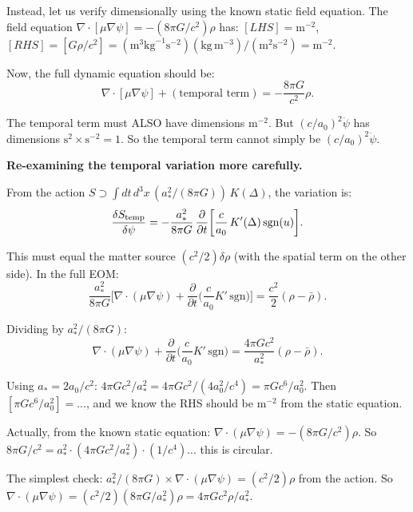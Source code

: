 \documentclass[11pt]{article}
\begin{document}
Instead, let us verify dimensionally using the known static field equation.
The field equation $\nabla\cdot[\mu\nabla\psi] = -(8\pi G/c^2)\rho$ has:
$[LHS] = \text{m}^{-2}$,
$[RHS] = [G\rho/c^2] = (\text{m}^3\text{kg}^{-1}\text{s}^{-2})
(\text{kg}\,\text{m}^{-3})/(\text{m}^2\text{s}^{-2}) = \text{m}^{-2}$. \checkmark

Now, the full dynamic equation should be:
\begin{equation}
\nabla\cdot[\mu\nabla\psi] + (\text{temporal term}) = -\frac{8\pi G}{c^2}\rho.
\end{equation}

The temporal term must ALSO have dimensions $\text{m}^{-2}$. But
$(c/a_0)^2\ddot\psi$ has dimensions $\text{s}^2 \times \text{s}^{-2} = 1$.
So the temporal term cannot simply be $(c/a_0)^2\ddot\psi$.

\textbf{Re-examining the temporal variation more carefully.}

From the action $S \supset \int dt\,d^3x\,(a_*^2/(8\pi G))\,K(\Delta)$,
the variation is:
\begin{equation}
\frac{\delta S_{\rm temp}}{\delta\psi} = -\frac{a_*^2}{8\pi G}\,
\frac{\partial}{\partial t}\biggl[\frac{c}{a_0}\,K'(\Delta)\,\text{sgn}(u)\biggr].
\end{equation}

This must equal the matter source $(c^2/2)\delta\rho$ (with the spatial
term on the other side). In the full EOM:
\begin{equation}
\frac{a_*^2}{8\pi G}\biggl[\nabla\cdot(\mu\nabla\psi)
+ \frac{\partial}{\partial t}\biggl(\frac{c}{a_0}K'\,\text{sgn}\biggr)\biggr]
= \frac{c^2}{2}(\rho - \bar\rho).
\end{equation}

Dividing by $a_*^2/(8\pi G)$:
\begin{equation}
\nabla\cdot(\mu\nabla\psi)
+ \frac{\partial}{\partial t}\biggl(\frac{c}{a_0}K'\,\text{sgn}\biggr)
= \frac{4\pi G c^2}{a_*^2}(\rho - \bar\rho).
\end{equation}

Using $a_* = 2a_0/c^2$: $4\pi G c^2/a_*^2 = 4\pi G c^2/(4a_0^2/c^4)
= \pi G c^6/a_0^2$. Then $[\pi G c^6/a_0^2] = ...$, and we know the
RHS should be $\text{m}^{-2}$ from the static equation.

Actually, from the known static equation: $\nabla\cdot(\mu\nabla\psi)
= -(8\pi G/c^2)\rho$. So $8\pi G/c^2 = a_*^2 \cdot (4\pi G c^2/a_*^2)
\cdot (1/c^4)$... this is circular.

The simplest check: $a_*^2/(8\pi G) \times \nabla\cdot(\mu\nabla\psi)
= (c^2/2)\rho$ from the action. So $\nabla\cdot(\mu\nabla\psi) =
(c^2/2)(8\pi G/a_*^2)\rho = 4\pi G c^2 \rho/a_*^2$.
\end{document}
